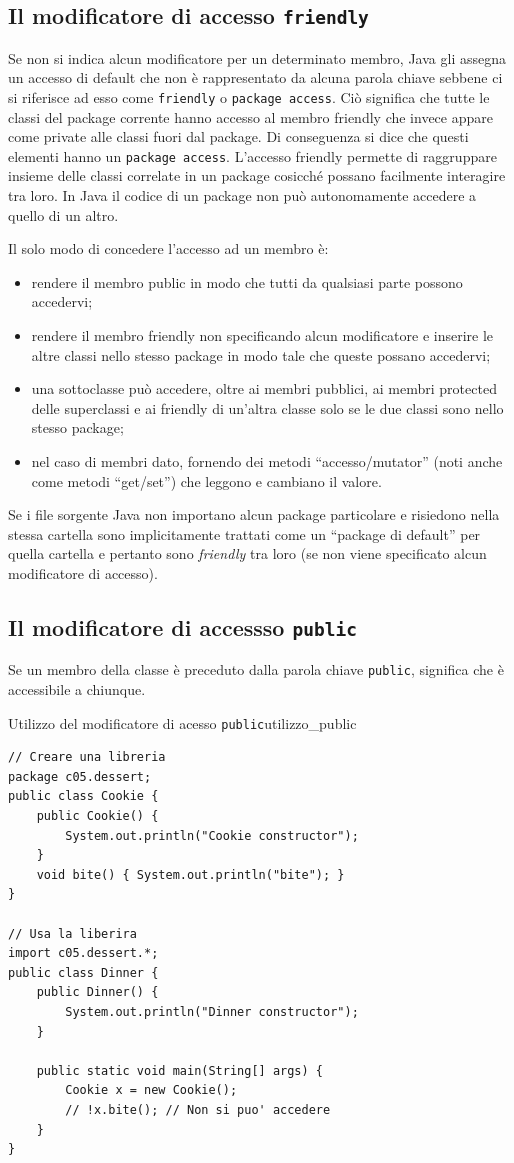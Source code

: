 \documentclass[12pt]{report}
\newcommand{\nmu}{}
\begin{document}
\subsection{Il modificatore di accesso \texttt{friendly}}
Se non si indica alcun modificatore per un determinato membro, Java gli assegna un accesso di default che non è rappresentato da alcuna parola chiave sebbene ci si riferisce ad esso come \texttt{friendly} o \texttt{package access}. Ciò significa che tutte le classi del package corrente hanno accesso al membro friendly che invece appare come private alle classi fuori dal package. Di conseguenza si dice che questi elementi hanno un \texttt{package access}. L'accesso friendly permette di raggruppare insieme delle classi correlate in un package cosicché possano facilmente interagire tra loro. In Java il codice di un package non può autonomamente accedere a quello di un altro.

Il solo modo di concedere l'accesso ad un membro è:
\begin{itemize}
	\item rendere il membro public in modo che tutti da qualsiasi parte possono accedervi;
	\item rendere il membro friendly non specificando alcun modificatore e inserire le altre classi nello stesso package in modo tale che queste possano accedervi;
	\item una sottoclasse può accedere, oltre ai membri pubblici, ai membri protected delle superclassi e ai  friendly di un'altra classe solo se le due classi sono nello stesso package;
	\item nel caso di membri dato, fornendo dei metodi ``accesso/mutator'' (noti anche come metodi ``get/set'') che leggono e cambiano il valore.
\end{itemize}
Se i file sorgente Java non importano alcun package particolare e risiedono nella stessa cartella sono implicitamente trattati come un ``package di default'' per quella cartella e pertanto sono \textit{friendly} tra loro (se non viene specificato alcun modificatore di accesso).

\subsection{Il modificatore di accessso \texttt{public}}
Se un membro della classe è preceduto dalla parola chiave \texttt{public}, significa che è accessibile a chiunque.
\begin{example}{\nmu Utilizzo del modificatore di acesso \texttt{public}}{utilizzo_public}
\begin{lstlisting}[style=javastyle]
// Creare una libreria
package c05.dessert;
public class Cookie {
	public Cookie() {
		System.out.println("Cookie constructor");
	}
	void bite() { System.out.println("bite"); }
}

// Usa la liberira
import c05.dessert.*;
public class Dinner {
	public Dinner() {
		System.out.println("Dinner constructor");
	}

	public static void main(String[] args) {
		Cookie x = new Cookie();
		// !x.bite(); // Non si puo' accedere
	}
}
\end{lstlisting}
\end{example}
\end{document}
